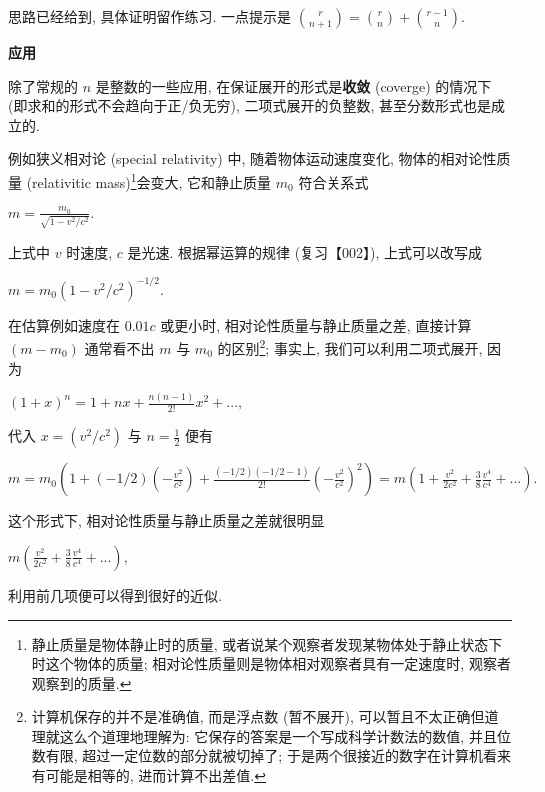 思路已经给到, 具体证明留作练习. 一点提示是
\(\binom{r}{n+1}=\binom{r}{n}+\binom{r-1}{n}\).

\textbf{应用}

除了常规的 \(n\) 是整数的一些应用, 在保证展开的形式是\textbf{收敛}
(coverge) 的情况下 (即求和的形式不会趋向于正/负无穷),
二项式展开的负整数, 甚至分数形式也是成立的.

例如狭义相对论 (special relativity) 中, 随着物体运动速度变化,
物体的相对论性质量 (relativitic mass)\footnote{静止质量是物体静止时的质量,
  或者说某个观察者发现某物体处于静止状态下时这个物体的质量;
  相对论性质量则是物体相对观察者具有一定速度时, 观察者观察到的质量.}会变大,
它和静止质量 \(m_0\) 符合关系式

\(m=\frac{m_0}{\sqrt{1-v^2/c^2}}.\)

上式中 \(v\) 时速度, \(c\) 是光速. 根据幂运算的规律 (复习【002】),
上式可以改写成

\(m=m_0(1-v^2/c^2)^{-1/2}.\)

在估算例如速度在 \(0.01c\) 或更小时, 相对论性质量与静止质量之差,
直接计算 \((m-m_0)\) 通常看不出 \(m\) 与 \(m_0\) 的区别\footnote{计算机保存的并不是准确值,
  而是浮点数 (暂不展开), 可以暂且不太正确但道理就这么个道理地理解为:
  它保存的答案是一个写成科学计数法的数值, 并且位数有限,
  超过一定位数的部分就被切掉了;
  于是两个很接近的数字在计算机看来有可能是相等的, 进而计算不出差值.};
事实上, 我们可以利用二项式展开, 因为

\((1+x)^n=1+nx+\frac{n(n-1)}{2!}x^2+...,\)

代入 \(x=(v^2/c^2)\) 与 \(n=\frac{1}{2}\) 便有

\(m=m_0\left(1+(-1/2)\left(-\frac{v^2}{c^2}\right)+\frac{(-1/2)(-1/2-1)}{2!}\left(-\frac{v^2}{c^2}\right)^2\right)=m\left(1+\frac{v^2}{2c^2}+\frac{3}{8}\frac{v^4}{c^4}+...\right).\)

这个形式下, 相对论性质量与静止质量之差就很明显

\(m\left(\frac{v^2}{2c^2}+\frac{3}{8}\frac{v^4}{c^4}+...\right),\)

利用前几项便可以得到很好的近似.
